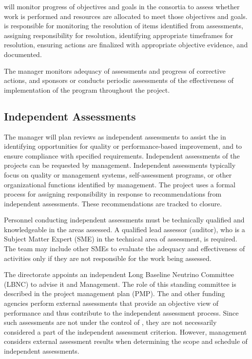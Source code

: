   will monitor progress
of objectives and goals in the consortia to assess whether work is
performed and resources are allocated to meet those objectives and
goals.    is responsible for monitoring the
resolution of items identified from assessments, assigning
responsibility for resolution, identifying appropriate timeframes for
resolution, ensuring actions are finalized with appropriate objective
evidence, and documented.

The   manager monitors adequacy of
assessments and progress of corrective actions, and sponsors or conducts
periodic assessments of the effectiveness of implementation of the 
program throughout the  project.




\subsection{Independent Assessments}

The   manager will plan reviews as
independent assessments to assist the   in
identifying opportunities for quality or performance-based improvement,
and to ensure compliance with specified requirements. Independent
assessments of the  projects can be requested by
 management. Independent assessments typically focus on
quality or  management systems, self-assessment programs, or
other organizational functions identified by management. The
 project uses a formal process for assigning
responsibility in response to recommendations from independent
assessments. These recommendations are tracked to closure.

Personnel conducting independent assessments must be technically
qualified and knowledgeable in the areas assessed. A qualified lead
assessor (auditor), who is a Subject Matter Expert (SME) in the
technical area of assessment, is required. The team may include other
SMEs to evaluate the adequacy and effectiveness of activities only if
they are not responsible for the work being assessed.

The \fnal directorate appoints an independent Long Baseline Neutrino
Committee (LBNC) to advise it and  Management. The role of
this standing committee is described in the 
project management plan (PMP). The  and other funding agencies perform external
assessments that provide an objective view of performance and thus
contribute to the independent assessment process. Since such
assessments are not under the control of , they are not
necessarily considered a part of the independent assessment
criterion. However,  management considers external
assessment results when determining the scope and schedule of
independent assessments.

